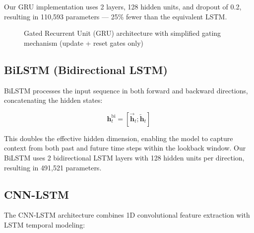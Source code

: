 Our GRU implementation uses 2 layers, 128 hidden units, and dropout of 0.2, resulting in 110,593 parameters --- 25\% fewer than the equivalent LSTM.

\begin{figure}[H]
\centering
{}
\caption{Gated Recurrent Unit (GRU) architecture with simplified gating mechanism (update + reset gates only)}
\label{fig:gru_arch}
\end{figure}

\subsection{BiLSTM (Bidirectional LSTM)}

BiLSTM processes the input sequence in both forward and backward directions, concatenating the hidden states:

\begin{equation}
    \mathbf{h}_t^{\text{bi}} = [\overrightarrow{\mathbf{h}}_t ; \overleftarrow{\mathbf{h}}_t]
\end{equation}

This doubles the effective hidden dimension, enabling the model to capture context from both past and future time steps within the lookback window. Our BiLSTM uses 2 bidirectional LSTM layers with 128 hidden units per direction, resulting in 491,521 parameters.

\subsection{CNN-LSTM}

The CNN-LSTM architecture combines 1D convolutional feature extraction with LSTM temporal modeling:

